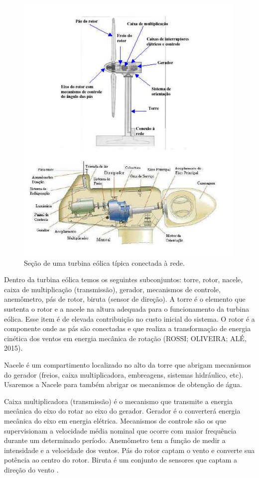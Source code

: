 \documentclass[12pt,openright,oneside,a4paper,brazil]{abntex2}
\begin{document}
\begin{figure}[!htbp]
\centering
\includegraphics[scale=0.80]{turbina}
\caption[Caption title in LOF]{Seção de uma turbina eólica típica conectada à rede.\footnotemark}
\FloatBarrier
\label{Max_Water}
\end{figure}

Dentro da turbina eólica temos os seguintes subconjuntos: torre, rotor, nacele, caixa de multiplicação (transmissão), gerador, mecanismos de controle, anemômetro, pás de rotor, biruta (sensor de direção). A torre é o elemento que sustenta o rotor e a nacele na altura adequada para o funcionamento da turbina eólica. Esse item é de elevada contribuição no custo inicial do sistema. O rotor é a componente onde as pás são conectadas e que realiza a transformação de energia cinética dos ventos em energia mecânica de rotação (ROSSI; OLIVEIRA; ALÉ, 2015).

	Nacele é um compartimento localizado no alto da torre que abrigam mecanismos do gerador (freios, caixa multiplicadora, embreagens, sistemas hidráulico, etc). Usaremos a Nacele para também abrigar os mecanismos de obtenção de água. 
	
	Caixa multiplicadora (transmissão) é o mecanismo que transmite a energia mecânica do eixo do rotar ao eixo do gerador. Gerador é o converterá energia mecânica do eixo em energia elétrica. Mecanismos de controle são os que supervisionam a velocidade média nominal que ocorre com maior frequência durante um determinado período. Anemômetro tem a função de medir a intensidade e a velocidade dos ventos. Pás do rotor captam o vento e converte sua potência ao centro do rotor. Biruta é um conjunto de sensores que captam a direção do vento \cite{wessberg2000real}.
	
\end{document}
